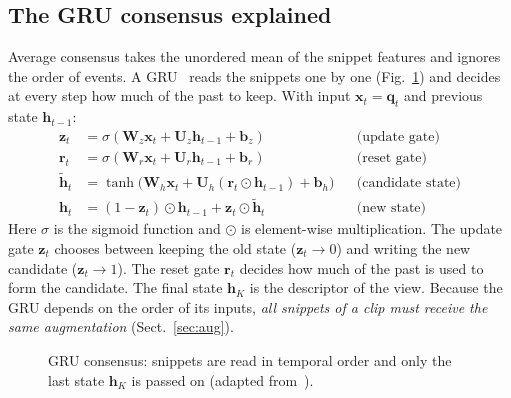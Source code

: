 \documentclass[runningheads]{llncs}
\begin{document}
\subsection{The GRU consensus explained}
Average consensus takes the unordered mean of the snippet features and ignores the order of events. A GRU~\cite{cho2014} reads the snippets one by one (Fig.~\ref{fig:gru}) and decides at every step how much of the past to keep. With input $\mathbf x_t=\mathbf q_t$ and previous state $\mathbf h_{t-1}$:
\begin{align}
\mathbf z_t &= \sigma(\mathbf W_z\mathbf x_t+\mathbf U_z\mathbf h_{t-1}+\mathbf b_z) &&\text{(update gate)}\\
\mathbf r_t &= \sigma(\mathbf W_r\mathbf x_t+\mathbf U_r\mathbf h_{t-1}+\mathbf b_r) &&\text{(reset gate)}\\
\tilde{\mathbf h}_t &= \tanh\!\big(\mathbf W_h\mathbf x_t+\mathbf U_h(\mathbf r_t\odot\mathbf h_{t-1})+\mathbf b_h\big) &&\text{(candidate state)}\\
\mathbf h_t &= (1-\mathbf z_t)\odot\mathbf h_{t-1}+\mathbf z_t\odot\tilde{\mathbf h}_t &&\text{(new state)}
\end{align}
Here $\sigma$ is the sigmoid function and $\odot$ is element-wise multiplication. The update gate $\mathbf z_t$ chooses between keeping the old state ($\mathbf z_t\to0$) and writing the new candidate ($\mathbf z_t\to1$). The reset gate $\mathbf r_t$ decides how much of the past is used to form the candidate. The final state $\mathbf h_K$ is the descriptor of the view. Because the GRU depends on the order of its inputs, \emph{all snippets of a clip must receive the same augmentation} (Sect.~\ref{sec:aug}).

\begin{figure}[t]
\centering
{}
\caption{GRU consensus: snippets are read in temporal order and only the last state $\mathbf h_K$ is passed on (adapted from~\cite{bui2020}).}\label{fig:gru}
\end{figure}
\end{document}
